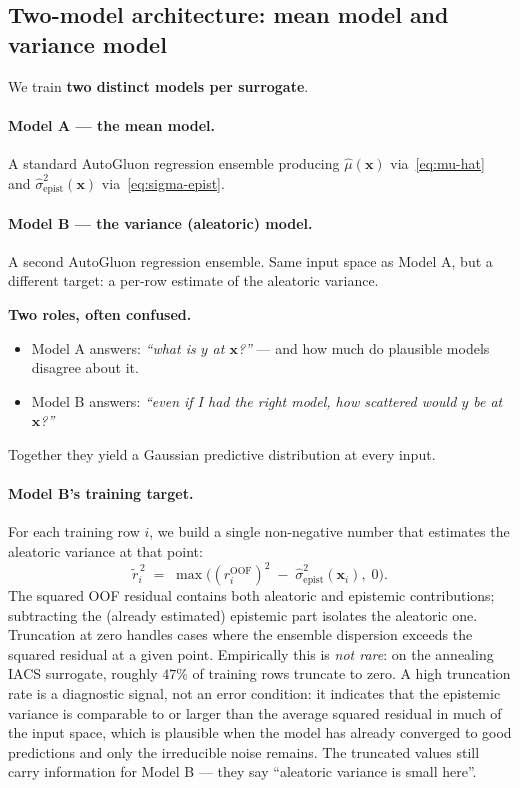 \documentclass[11pt,a4paper]{article}
\begin{document}
\subsection{Two-model architecture: mean model and variance model}
\label{sec:variance-model}

We train \textbf{two distinct models per surrogate}.

\paragraph{Model A --- the mean model.} A standard AutoGluon regression ensemble producing $\hat\mu(\bm x)$ via~\eqref{eq:mu-hat} and $\hat\sigma^2_{\text{epist}}(\bm x)$ via~\eqref{eq:sigma-epist}.

\paragraph{Model B --- the variance (aleatoric) model.} A second AutoGluon regression ensemble. Same input space as Model A, but a different target: a per-row estimate of the aleatoric variance.

\begin{intuitionbox}
\textbf{Two roles, often confused.}
\begin{itemize}
    \item Model A answers: \emph{``what is $y$ at $\bm x$?''} --- and how much do plausible models disagree about it.
    \item Model B answers: \emph{``even if I had the right model, how scattered would $y$ be at $\bm x$?''}
\end{itemize}
Together they yield a Gaussian predictive distribution at every input.
\end{intuitionbox}

\paragraph{Model B's training target.} For each training row $i$, we build a single non-negative number that estimates the aleatoric variance at that point:
\begin{equation}
\tilde r_i^{\,2} \;=\; \max\!\Big( (r_i^{\text{OOF}})^2 \;-\; \hat\sigma^2_{\text{epist}}(\bm x_i),\; 0 \Big).
\label{eq:residual-correction}
\end{equation}
The squared OOF residual contains both aleatoric and epistemic contributions; subtracting the (already estimated) epistemic part isolates the aleatoric one. Truncation at zero handles cases where the ensemble dispersion exceeds the squared residual at a given point. Empirically this is \emph{not rare}: on the annealing IACS surrogate, roughly $47\%$ of training rows truncate to zero. A high truncation rate is a diagnostic signal, not an error condition: it indicates that the epistemic variance is comparable to or larger than the average squared residual in much of the input space, which is plausible when the model has already converged to good predictions and only the irreducible noise remains. The truncated values still carry information for Model B --- they say ``aleatoric variance is small here''.
\end{document}
